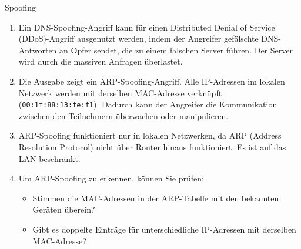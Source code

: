 \documentclass{article}
\begin{document}
\begin{exercise}{Spoofing}
  \begin{solution}
    \begin{enumerate}
        \item Ein DNS-Spoofing-Angriff kann für einen Distributed Denial of Service (DDoS)-Angriff ausgenutzt werden, indem der Angreifer gefälschte DNS-Antworten an Opfer sendet, die zu einem falschen Server führen. Der Server wird durch die massiven Anfragen überlastet.
        \item Die Ausgabe zeigt ein ARP-Spoofing-Angriff. Alle IP-Adressen im lokalen Netzwerk werden mit derselben MAC-Adresse verknüpft (\texttt{00:1f:88:13:fe:f1}). Dadurch kann der Angreifer die Kommunikation zwischen den Teilnehmern überwachen oder manipulieren.
        \item ARP-Spoofing funktioniert nur in lokalen Netzwerken, da ARP (Address Resolution Protocol) nicht über Router hinaus funktioniert. Es ist auf das LAN beschränkt.
        \item Um ARP-Spoofing zu erkennen, können Sie prüfen:
        \begin{itemize}
            \item Stimmen die MAC-Adressen in der ARP-Tabelle mit den bekannten Geräten überein?
            \item Gibt es doppelte Einträge für unterschiedliche IP-Adressen mit derselben MAC-Adresse?
        \end{itemize}
    \end{enumerate}
  \end{solution}
\end{exercise}
\end{document}
